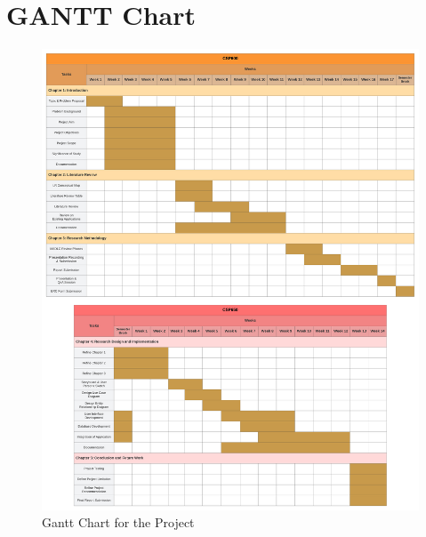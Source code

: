 \chapter{GANTT Chart}
\label{app:data}
\begin{figure}[h]
    \centering
    \includegraphics[width=1.0\linewidth]{appendices/ganttchart.png}
    \caption{Gantt Chart for the Project}
    \label{fig:myfig83}
\end{figure}
\clearpage
